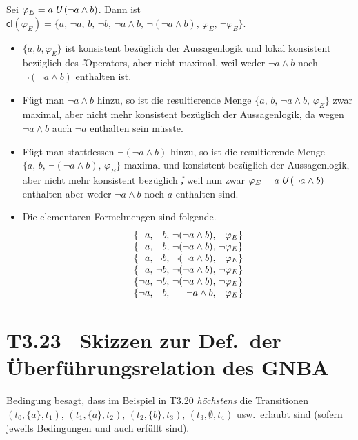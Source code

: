\documentclass[fontsize=11pt, twoside=false, numbers=autoenddot]{scrbook}
\begin{document}
Sei $\varphi_E = a\mathbin{\textit{\textsf{U}}}(\lnot a \land b)$.
Dann ist $\textsf{cl}(\varphi_E) = \{a,\, \lnot a,\, b,\, \lnot b,\, \lnot a \land b,\, \lnot(\lnot a \land b),\, \varphi_E,\, \lnot \varphi_E\}$.
%
\begin{itemize}
  \item
    $\{a,b,\varphi_E\}$ ist konsistent bezüglich der Aussagenlogik und lokal konsistent bezüglich des \U-Operators,
    aber nicht maximal, weil weder $\lnot a \land b$ noch $\lnot(\lnot a \land b)$ enthalten ist.
  \item
    Fügt man $\lnot a \land b$ hinzu, so ist die resultierende Menge $\{a,\,b,\,\lnot a \land b,\,\varphi_E\}$ 
    zwar maximal, aber nicht mehr konsistent bezüglich der Aussagenlogik,
    da wegen $\lnot a \land b$ auch $\lnot a$ enthalten sein müsste.
  \item
    Fügt man stattdessen $\lnot(\lnot a \land b)$ hinzu, 
    so ist die resultierende Menge \mbox{$\{a,\,b,\,\lnot(\lnot a \land b),\,\varphi_E\}$}
    maximal und konsistent bezüglich der Aussagenlogik,
    aber nicht mehr konsistent bezüglich \U,
    weil nun zwar $\varphi_E = a \mathbin{\textit{\textsf{U}}} (\lnot a \land b)$ enthalten
    aber weder $\lnot a \land b$ noch $a$ enthalten sind.
  \item
    Die elementaren Formelmengen sind folgende.
    \[
      \begin{array}{@{\{}r@{,~}r@{,~}r@{,~}r@{\}}}
        a       & b       & \lnot(\lnot a \land b) & \varphi_E      \\
        a       & b       & \lnot(\lnot a \land b) & \lnot\varphi_E \\
        a       & \lnot b & \lnot(\lnot a \land b) & \varphi_E      \\
        a       & \lnot b & \lnot(\lnot a \land b) & \lnot\varphi_E \\
        \lnot a & \lnot b & \lnot(\lnot a \land b) & \lnot\varphi_E \\
        \lnot a & b       & \lnot a \land b        & \varphi_E
      \end{array}
    \]
\end{itemize}

\section*{T3.23~ Skizzen zur Def.\ der Überführungsrelation des GNBA}

Bedingung  besagt, dass im Beispiel in T3.20 \emph{höchstens}
die Transitionen $(t_0,\{a\},t_1)$, $(t_1,\{a\},t_2)$, $(t_2,\{b\},t_3)$, $(t_3,\emptyset,t_4)$ usw.\
erlaubt sind (sofern jeweils Bedingungen  und  auch erfüllt sind).
\end{document}
